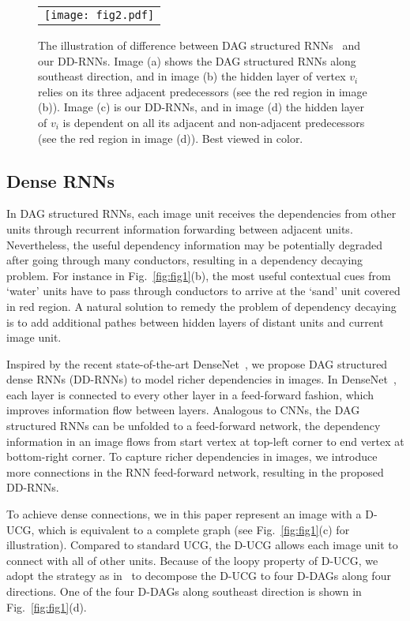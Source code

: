 \documentclass[10pt,twocolumn,letterpaper]{article}
\begin{document}
\begin{figure}[!t]
\centering
\begin{tabular}{c}
\texttt{[image: fig2.pdf]}\\
\end{tabular}
\caption{The illustration of difference between DAG structured RNNs~\cite{shuai2017scene} and our DD-RNNs. Image (a) shows the DAG structured RNNs along southeast direction, and in image (b) the hidden layer of vertex $v_i$ relies on its three adjacent predecessors (see the red region in image (b)). Image (c) is our DD-RNNs, and in image (d) the hidden layer of $v_i$ is dependent on all its adjacent and non-adjacent predecessors (see the red region in image (d)). Best viewed in color.}
\label{fig:fig2}
\end{figure}

\subsection{Dense RNNs}
\label{sec31}

In DAG structured RNNs, each image unit receives the dependencies from other units through recurrent information forwarding between adjacent units. Nevertheless, the useful dependency information may be potentially degraded after going through many conductors, resulting in a dependency decaying problem. For instance in Fig.~\ref{fig:fig1}(b), the most useful contextual cues from `water' units have to pass through conductors to arrive at the `sand' unit covered in red region. A natural solution to remedy the problem of dependency decaying is to add additional pathes between hidden layers of distant units and current image unit.

Inspired by the recent state-of-the-art DenseNet~\cite{huang2016densely}, we propose DAG structured dense RNNs (DD-RNNs) to model richer dependencies in images. In DenseNet~\cite{huang2016densely}, each layer is connected to every other layer in a feed-forward fashion, which improves information flow between layers. Analogous to CNNs, the DAG structured RNNs can be unfolded to a feed-forward network, the dependency information in an image flows from start vertex at top-left corner to end vertex at bottom-right corner. To capture richer dependencies in images, we introduce more connections in the RNN feed-forward network, resulting in the proposed DD-RNNs.

To achieve dense connections, we in this paper represent an image with a D-UCG, which is equivalent to a complete graph (see Fig.~\ref{fig:fig1}(c) for illustration). Compared to standard UCG, the D-UCG allows each image unit to connect with all of other units. Because of the loopy property of D-UCG, we adopt the strategy as in~\cite{shuai2017scene} to decompose the D-UCG to four D-DAGs along four directions. One of the four D-DAGs along southeast direction is shown in Fig.~\ref{fig:fig1}(d).
\end{document}

